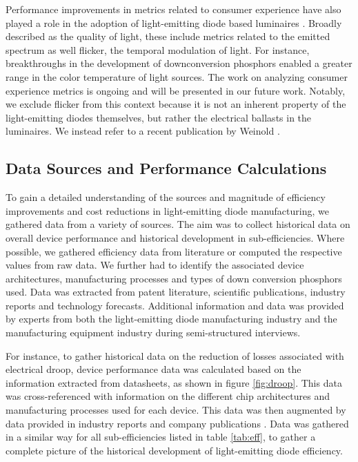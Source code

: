 \documentclass[a4paper,nocompress]{spie}  %
\begin{document}
    Performance improvements in metrics related to consumer experience have also played a role in the adoption of light-emitting diode based luminaires \cite{cowan2011understanding}. Broadly described as the quality of light, these include metrics related to the emitted spectrum as well flicker, the temporal modulation of light. For instance, breakthroughs in the development of downconversion phosphors enabled a greater range in the color temperature of light sources. The work on analyzing consumer experience metrics is ongoing and will be presented in our future work. Notably, we exclude flicker from this context because it is not an inherent property of the light-emitting diodes themselves, but rather the electrical ballasts in the luminaires. We instead refer to a recent publication by Weinold \cite{weinold2020long}.

    \subsection{Data Sources and Performance Calculations}
    \label{subsec:data}
    
        To gain a detailed understanding of the sources and magnitude of efficiency improvements and cost reductions in light-emitting diode manufacturing, we gathered data from a variety of sources. The aim was to collect historical data on overall device performance and historical development in sub-efficiencies. Where possible, we gathered  efficiency data from literature or computed the respective values from raw data. We further had to identify the associated device architectures, manufacturing processes and types of down conversion phosphors used. Data was extracted from patent literature, scientific publications, industry reports and technology forecasts. Additional information and data was provided by experts from both the light-emitting diode manufacturing industry and the manufacturing equipment industry during semi-structured interviews. 
        
        For instance, to gather historical data on the reduction of losses associated with electrical droop, device performance data was calculated based on the information extracted from datasheets, as shown in figure \ref{fig:droop}. This data was cross-referenced with information on the different chip architectures and manufacturing processes used for each device. This data was then augmented by data provided in industry reports and company publications \cite{osram2014osram}. Data was gathered in a similar way for all sub-efficiencies listed in table \ref{tab:eff}, to gather a complete picture of the historical development of light-emitting diode efficiency.
\end{document}
